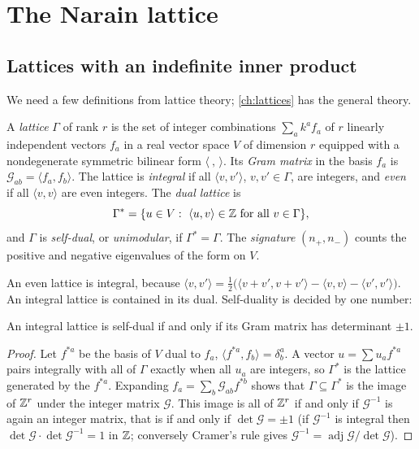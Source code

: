 \section{The Narain lattice}\label{sec:narain:lattice}

\subsection{Lattices with an indefinite inner product}

We need a few definitions from lattice theory; \cref{ch:lattices} has the general theory.

\begin{definition}\label{def:narain:lattice}
A \emph{lattice} $\Gamma$ of rank $r$ is the set of integer combinations
$\sum_ak^af_a$ of $r$ linearly independent vectors $f_a$ in a real vector space $V$ of
dimension $r$ equipped with a nondegenerate symmetric bilinear form $\langle\ ,\,\rangle$.
Its \emph{Gram matrix} in the basis $f_a$ is
$\mathcal G_{ab}=\langle f_a,f_b\rangle$. The lattice is \emph{integral} if all
$\langle v,v'\rangle$, $v,v'\in\Gamma$, are integers, and \emph{even} if
all $\langle v,v\rangle$ are even integers. The \emph{dual lattice} is
\[
 \Gamma^*=\{u\in V:\ \langle u,v\rangle\in\Z\ \text{for all }v\in\Gamma\},
\]
and $\Gamma$ is \emph{self-dual}, or
\emph{unimodular}, if $\Gamma^*=\Gamma$. The \emph{signature}
$(n_+,n_-)$ counts the positive and negative eigenvalues of the form on $V$.
\end{definition}

An even lattice is integral, because
$\langle v,v'\rangle=\frac12\big(\langle v+v',v+v'\rangle-\langle v,v\rangle-\langle v',v'\rangle\big)$.
An integral lattice is contained in its dual. Self-duality is decided by one number:

\begin{lemma}\label{thm:narain:det}
An integral lattice is self-dual if and only if its Gram matrix has determinant $\pm1$.
\end{lemma}

\begin{proof}
Let $f^{*a}$ be the basis of $V$ dual to $f_a$, $\langle f^{*a},f_b\rangle=\delta^a_b$. A
vector $u=\sum u_af^{*a}$ pairs integrally with all of $\Gamma$ exactly when all $u_a$ are
integers, so $\Gamma^*$ is the lattice generated by the $f^{*a}$. Expanding
$f_a=\sum_b\mathcal G_{ab}f^{*b}$ shows that $\Gamma\subseteq\Gamma^*$ is the image of $\mathbb{Z}^r$
under the integer matrix $\mathcal G$. This image is all of $\mathbb{Z}^r$ if and only if
$\mathcal G^{-1}$ is again an integer matrix, that is if and only if $\det\mathcal G=\pm1$
(if $\mathcal G^{-1}$ is integral then $\det\mathcal G\cdot\det\mathcal G^{-1}=1$ in $\mathbb{Z}$;
conversely Cramer's rule gives $\mathcal G^{-1}=\operatorname{adj}\mathcal G/\det\mathcal G$).
\end{proof}

